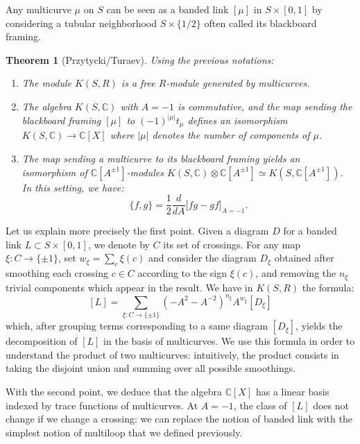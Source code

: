 \documentclass{amsart}
\newtheorem{theorem}{Theorem}
\newcommand{\C}{\mathbb{C}}
\begin{document}
Any multicurve $\mu$ on $S$ can be seen as a banded link $[\mu]$ in $S\times[0,1]$ by considering a tubular neighborhood $S\times\{1/2\}$ often called its blackboard framing.

\begin{theorem}[Przytycki/Turaev]\label{skein} Using the previous notations:
\begin{enumerate}
\item The module $K(S,R)$ is a free $R$-module generated by multicurves.
\item The algebra $K(S,\C)$ with $A=-1$ is commutative, and the map sending the blackboard framing $[\mu]$ to $(-1)^{|\mu|}t_\mu$ defines an isomorphism $K(S,\C)\to \C[X]$ where $|\mu|$ denotes the number of components of $\mu$. 
\item The map sending a multicurve to its blackboard framing yields an isomorphism of $\C[A^{\pm 1}]$-modules $K(S,\C)\otimes \C[A^{\pm 1}] \simeq K(S,\C[A^{\pm 1}])$.
In this setting, we have: $$\{f,g\}=\frac{1}{2}\frac{d}{dA}\Big[ fg-gf\Big]_{A=-1}.$$
\end{enumerate}
\end{theorem}

Let us explain more precisely the first point. Given a diagram $D$ for a banded link $L\subset S\times [0,1]$, we denote by $C$ its set of crossings. For any map $\xi\colon C\to \{\pm 1\}$, set $w_\xi=\sum_{c} \xi(c)$ and consider the diagram $D_\xi$ obtained after smoothing each crossing $c\in C$ according to the sign $\xi(c)$, and removing the $n_\xi$ trivial components which appear in the result. 
We have in $K(S,R)$ the formula:
\begin{equation}\label{smoothing}
[L]=\sum_{\xi:C\to \{\pm 1\}}(-A^2-A^{-2})^{n_\xi} A^{w_\xi} [D_\xi]
\end{equation}
which, after grouping terms corresponding to a same diagram $[D_\xi]$, yields the decomposition of $[L]$ in the basis of multicurves. We use this formula in order to understand the product of two multicurves: intuitively, the product consists in taking the disjoint union and summing over all possible smoothings. 

With the second point, we deduce that the algebra $\C[X]$ has a linear basis indexed by trace functions of multicurves. At $A=-1$, the class of $[L]$ does not change if we change a crossing: we can replace the notion of banded link with the simplest notion of multiloop that we defined previously.
\end{document}
